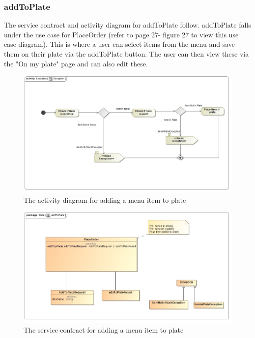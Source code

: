\documentclass[a4paper,12pt]{report}
\begin{document}
\subsubsection{addToPlate }
The service contract and activity diagram for addToPlate follow. addToPlate falls under the use case for PlaceOrder (refer to page 27- figure 27 to view this use case diagram). This is where a user can select items from the menu and save them on their plate via the addToPlate button. The user can then view these via the "On my plate" page and can also edit these.
\begin{figure}[H]
  \centering
    \includegraphics[width=1.0\textwidth]{../images/AddToPlateActivity.jpg}
    \caption{The activity diagram for adding a menu item to plate} 
\end{figure}
\begin{figure}[H]
  \centering
    \includegraphics[width=1.0\textwidth]{../images/addToPlateServicee.jpg}
    \caption{The service contract for adding a menu item to plate} 
\end{figure}
\end{document}
